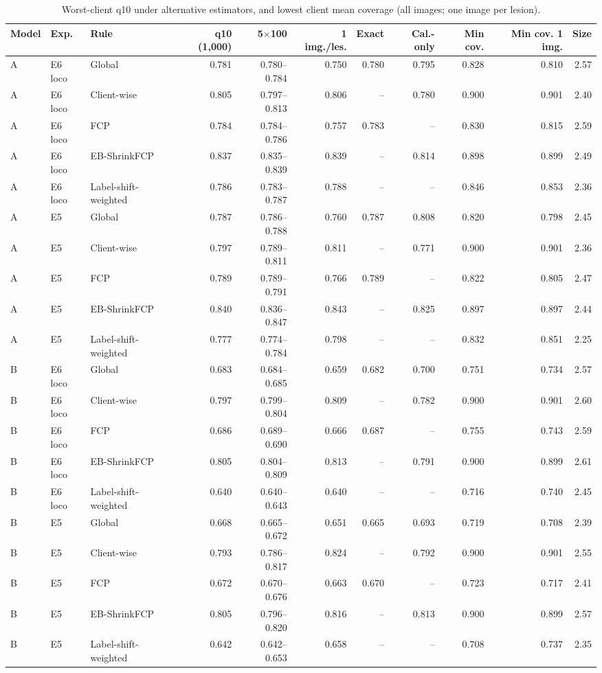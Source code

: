 \documentclass[10pt]{article}
\begin{document}
\begin{table}[!htbp]
\centering
\scriptsize
\caption{Worst-client q10 under alternative estimators, and lowest client mean coverage (all images; one image per lesion).}
\label{tab:s6}
\begin{tabular}{@{}lllrrrrrrrr@{}}
\toprule
Model & Exp. & Rule & q10 (1,000) & 5$\times$100 & 1 img./les. & Exact & Cal.-only & Min cov. & Min cov. 1 img. & Size \\
\midrule
A & E6 loco & Global & 0.781 & 0.780--0.784 & 0.750 & 0.780 & 0.795 & 0.828 & 0.810 & 2.57 \\
A & E6 loco & Client-wise & 0.805 & 0.797--0.813 & 0.806 & -- & 0.780 & 0.900 & 0.901 & 2.40 \\
A & E6 loco & FCP & 0.784 & 0.784--0.786 & 0.757 & 0.783 & -- & 0.830 & 0.815 & 2.59 \\
A & E6 loco & EB-ShrinkFCP & 0.837 & 0.835--0.839 & 0.839 & -- & 0.814 & 0.898 & 0.899 & 2.49 \\
A & E6 loco & Label-shift-weighted & 0.786 & 0.783--0.787 & 0.788 & -- & -- & 0.846 & 0.853 & 2.36 \\
\midrule
A & E5 & Global & 0.787 & 0.786--0.788 & 0.760 & 0.787 & 0.808 & 0.820 & 0.798 & 2.45 \\
A & E5 & Client-wise & 0.797 & 0.789--0.811 & 0.811 & -- & 0.771 & 0.900 & 0.901 & 2.36 \\
A & E5 & FCP & 0.789 & 0.789--0.791 & 0.766 & 0.789 & -- & 0.822 & 0.805 & 2.47 \\
A & E5 & EB-ShrinkFCP & 0.840 & 0.836--0.847 & 0.843 & -- & 0.825 & 0.897 & 0.897 & 2.44 \\
A & E5 & Label-shift-weighted & 0.777 & 0.774--0.784 & 0.798 & -- & -- & 0.832 & 0.851 & 2.25 \\
\midrule
B & E6 loco & Global & 0.683 & 0.684--0.685 & 0.659 & 0.682 & 0.700 & 0.751 & 0.734 & 2.57 \\
B & E6 loco & Client-wise & 0.797 & 0.799--0.804 & 0.809 & -- & 0.782 & 0.900 & 0.901 & 2.60 \\
B & E6 loco & FCP & 0.686 & 0.689--0.690 & 0.666 & 0.687 & -- & 0.755 & 0.743 & 2.59 \\
B & E6 loco & EB-ShrinkFCP & 0.805 & 0.804--0.809 & 0.813 & -- & 0.791 & 0.900 & 0.899 & 2.61 \\
B & E6 loco & Label-shift-weighted & 0.640 & 0.640--0.643 & 0.640 & -- & -- & 0.716 & 0.740 & 2.45 \\
\midrule
B & E5 & Global & 0.668 & 0.665--0.672 & 0.651 & 0.665 & 0.693 & 0.719 & 0.708 & 2.39 \\
B & E5 & Client-wise & 0.793 & 0.786--0.817 & 0.824 & -- & 0.792 & 0.900 & 0.901 & 2.55 \\
B & E5 & FCP & 0.672 & 0.670--0.676 & 0.663 & 0.670 & -- & 0.723 & 0.717 & 2.41 \\
B & E5 & EB-ShrinkFCP & 0.805 & 0.796--0.820 & 0.816 & -- & 0.813 & 0.900 & 0.899 & 2.57 \\
B & E5 & Label-shift-weighted & 0.642 & 0.642--0.653 & 0.658 & -- & -- & 0.708 & 0.737 & 2.35 \\
\bottomrule
\end{tabular}
\end{table}
\end{document}

